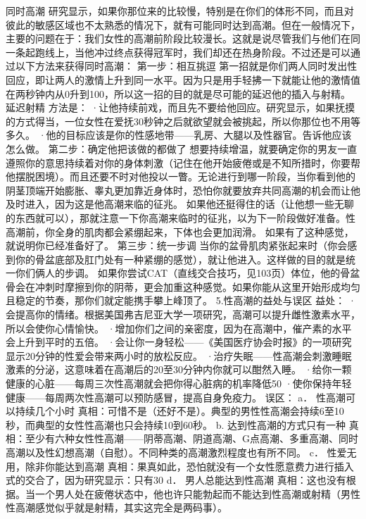 \documentclass[12pt,UTF8,openany]{ctexbook}
\begin{document}
同时高潮
研究显示，如果你那位来的比较慢，特别是在你们的体形不同，而且对彼此的敏感区域也不太熟悉的情况下，就有可能同时达到高潮。但在一般情况下，主要的问题在于：我们女性的高潮前阶段比较漫长。这就是说尽管我们与他们在同一条起跑线上，当他冲过终点获得冠军时，我们却还在热身阶段。不过还是可以通过以下方法来获得同时高潮：
第一步：相互挑逗
第一招就是你们两人同时发出性回应，即让两人的激情上升到同一水平。因为只是用手轻拂一下就能让他的激情值在两秒钟内从0升到100，所以这一招的目的就是尽可能的延迟他的插入与射精。
延迟射精
方法是：
·让他持续前戏，而且先不要给他回应。研究显示，如果抚摸的方式得当，一位女性在爱抚30秒钟之后就欲望就会被挑起，所以你那位也不用等多久。
·他的目标应该是你的性感地带——乳房、大腿以及性器官。告诉他应该怎么做。
第二步：确定他把该做的都做了
想要持续增温，就要确定你的男友一直遵照你的意思持续着对你的身体刺激（记住在他开始疲倦或是不知所措时，你要帮他摆脱困境）。而且还要不时对他投以一瞥。无论进行到哪一阶段，当你看到他的阴茎顶端开始膨胀、睾丸更加靠近身体时，恐怕你就要放弃共同高潮的机会而让他及时进入，因为这是他高潮来临的征兆。
如果他还挺得住的话（让他想一些无聊的东西就可以），那就注意一下你高潮来临时的征兆，以为下一阶段做好准备。性高潮前，你全身的肌肉都会紧绷起来，下体也会更加润滑。
如果有了这种感觉，就说明你已经准备好了。
第三步：统一步调
当你的盆骨肌肉紧张起来时（你会感到你的骨盆底部及肛门处有一种紧绷的感觉），就让他进入。这样做的目的就是统一你们俩人的步调。
如果你尝试CAT（直线交合技巧，见103页）体位，他的骨盆骨会在冲刺时摩擦到你的阴蒂，更会加重这种感觉。如果你能从这里开始形成均匀且稳定的节奏，那你们就定能携手攀上峰顶了。
5.性高潮的益处与误区
益处：
·会提高你的情绪。根据美国弗吉尼亚大学一项研究，高潮可以提升雌性激素水平，所以会使你心情愉快。
·增加你们之间的亲密度，因为在高潮中，催产素的水平会上升到平时的五倍。
·会让你一身轻松——《美国医疗协会时报》的一项研究显示20分钟的性爱会带来两小时的放松反应。
·治疗失眠——性高潮会刺激睡眠激素的分泌，这意味着在高潮后的20至30分钟内你就可以酣然入睡。
·给你一颗健康的心脏——每周三次性高潮就会把你得心脏病的机率降低50%
·使你保持年轻健康——每周两次性高潮可以预防感冒，提高自身免疫力。
误区：
a． 性高潮可以持续几个小时
真相：可惜不是（还好不是）。典型的男性性高潮会持续6至10秒，而典型的女性性高潮也只会持续10到60秒。
b. 达到性高潮的方式只有一种
真相：至少有六种女性性高潮——阴蒂高潮、阴道高潮、G点高潮、多重高潮、同时高潮以及性幻想高潮（自慰）。不同种类的高潮激烈程度也有所不同。
c． 性爱无用，除非你能达到高潮
真相：果真如此，恐怕就没有一个女性愿意费力进行插入式的交合了，因为研究显示：只有30%
d． 男人总能达到性高潮
真相：这也没有根据。当一个男人处在疲倦状态中，他也许只能勃起而不能达到性高潮或射精（男性性高潮感觉似乎就是射精，其实这完全是两码事）。
\end{document}
